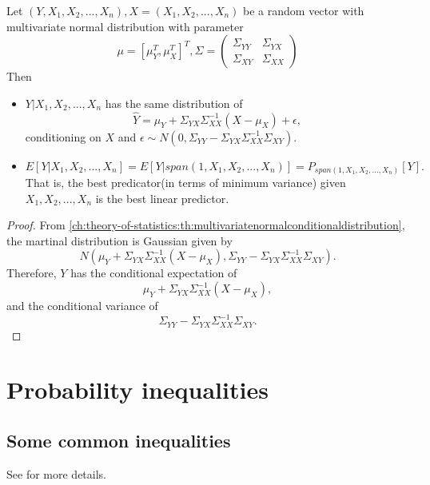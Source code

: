 \begin{refsection}
\begin{lemma}\label{ch:theory-of-probability:th:BestPredictorForMultivariateNormalVariables}
Let $(Y,X_1,X_2,...,X_n), X=(X_1,X_2,...,X_n)$ be a random vector with multivariate normal distribution with parameter  $$\mu = [\mu_Y^T ,\mu_X^T]^T,\Sigma = 
\begin{pmatrix}
\Sigma_{YY} & \Sigma_{YX} \\
\Sigma_{XY} & \Sigma_{XX}
\end{pmatrix}
$$ 	
Then 
\begin{itemize}
	\item $Y|X_1,X_2,...,X_n$ has the same distribution of
	$$\hat{Y} = \mu_Y + \Sigma_{YX}\Sigma_{XX}^{-1}(X-\mu_X) + \epsilon,$$
	conditioning on $X$ and $\epsilon \sim N(0,\Sigma_{YY} - \Sigma_{YX}\Sigma_{XX}^{-1}\Sigma_{XY})$. 
	\item $$E[Y|X_1,X_2,...,X_n] = E[Y|span(1,X_1,X_2,...,X_n)] = P_{span(1,X_1,X_2,...,X_n)}[Y].$$
	That is, the best predicator(in terms of minimum variance) given $X_1,X_2,...,X_n$ is the best linear predictor.
\end{itemize}
\end{lemma}
\begin{proof}
From \autoref{ch:theory-of-statistics:th:multivariatenormalconditionaldistribution}, the martinal distribution is Gaussian given by $$N(\mu_Y + \Sigma_{YX}\Sigma_{XX}^{-1}(X-\mu_X),\Sigma_{YY} - \Sigma_{YX}\Sigma_{XX}^{-1}\Sigma_{XY}).$$	
Therefore, $Y$ has the conditional expectation of $$\mu_Y + \Sigma_{YX}\Sigma_{XX}^{-1}(X-\mu_X),$$
and the conditional variance of
$$\Sigma_{YY} - \Sigma_{YX}\Sigma_{XX}^{-1}\Sigma_{XY}.$$ 
\end{proof}


\section{Probability inequalities}
\subsection{Some common inequalities}
\begin{remark}
See \cite[137]{casella2002statistical} for more details.	
\end{remark}


\end{refsection}
